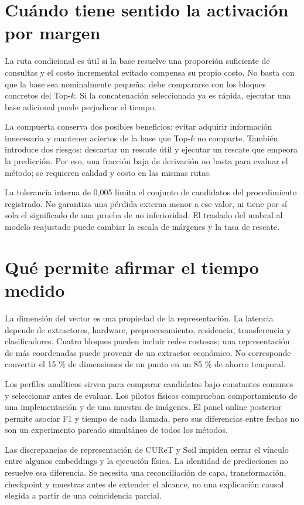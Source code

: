 \section{Cuándo tiene sentido la activación por margen}
La ruta condicional es útil si la base resuelve una proporción suficiente de consultas y el costo incremental evitado compensa su propio costo. No basta con que la base sea nominalmente pequeña; debe compararse con los bloques concretos del Top-\(k\). Si la concatenación seleccionada ya es rápida, ejecutar una base adicional puede perjudicar el tiempo.

La compuerta conserva dos posibles beneficios: evitar adquirir información innecesaria y mantener aciertos de la base que Top-\(k\) no comparte. También introduce dos riesgos: descartar un rescate útil y ejecutar un rescate que empeora la predicción. Por eso, una fracción baja de derivación no basta para evaluar el método; se requieren calidad y costo en las mismas rutas.

La tolerancia interna de 0,005 limita el conjunto de candidatos del procedimiento registrado. No garantiza una pérdida externa menor a ese valor, ni tiene por sí sola el significado de una prueba de no inferioridad. El traslado del umbral al modelo reajustado puede cambiar la escala de márgenes y la tasa de rescate.

\section{Qué permite afirmar el tiempo medido}
La dimensión del vector es una propiedad de la representación. La latencia depende de extractores, hardware, preprocesamiento, residencia, transferencia y clasificadores. Cuatro bloques pueden incluir redes costosas; una representación de más coordenadas puede provenir de un extractor económico. No corresponde convertir el 15 \% de dimensiones de un punto en un 85 \% de ahorro temporal.

Los perfiles analíticos sirven para comparar candidatos bajo constantes comunes y seleccionar antes de evaluar. Los pilotos físicos comprueban comportamiento de una implementación y de una muestra de imágenes. El panel online posterior permite asociar F1 y tiempo de cada llamada, pero sus diferencias entre fechas no son un experimento pareado simultáneo de todos los métodos.

Las discrepancias de representación de CUReT y Soil impiden cerrar el vínculo entre algunos embeddings y la ejecución física. La identidad de predicciones no resuelve esa diferencia. Se necesita una reconciliación de capa, transformación, checkpoint y muestras antes de extender el alcance, no una explicación causal elegida a partir de una coincidencia parcial.

